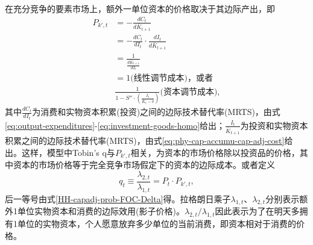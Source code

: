 在充分竞争的要素市场上，额外一单位资本的价格取决于其边际产出，即
\begin{equation}
\begin{split}
P_{k',t} &= - \frac{d C_t}{d \bar{K}_{t+1}} \nonumber \\
&=  - \frac{d C_t}{d I_t} \cdot \frac{d I_t}{d \bar{K}_{t+1}} \nonumber \\
&=\frac{1}{\frac{d \bar{ K}_{t+1}}{d I_t}} \nonumber \\
&=1\text{(线性调节成本)，或者} \nonumber \\
&\frac{1}{1-S''\cdot\left(\frac{I_t}{\bar{K}_{t} - \delta}\right)}\text{(资本调节成本)},
\end{split}
\end{equation}
其中$\frac{d C_t}{d I_t}$为消费和实物资本积累(投资)之间的边际技术替代率(MRTS)，由式\eqref{eq:output-expenditures}-\eqref{eq:investment-goods-homo}给出；$\frac{I_t}{\bar{K}_{t+1}}$为投资和实物资本积累之间的边际技术替代率(MRTS)，由式\eqref{eq:phy-cap-accumu-cap-adj-cost}给出。这样，模型中Tobin's q与$P_{k',t}$相关，为资本的市场价格除以投资品的价格，其中资本的市场价格等于完全竞争市场假定下的资本的边际成本。或者定义
\begin{equation}
\label{eq:tobin-q-sims-2015}
q_t \equiv \frac{\lambda_{2,t}}{\lambda_{1,t}} = P_t \cdot P_{k',t},
\end{equation}
后一等号由式\eqref{HH-capadj-prob-FOC-Delta}得。拉格朗日乘子$\lambda_{1,t}$、$\lambda_{2,t}$分别表示额外1单位实物资本和消费的边际效用(影子价格)。$\lambda_{2,t}/\lambda_{1,t}$因此表示为了在明天多拥有1单位的实物资本，个人愿意放弃多少单位的当前消费，即资本相对于消费的价格。

